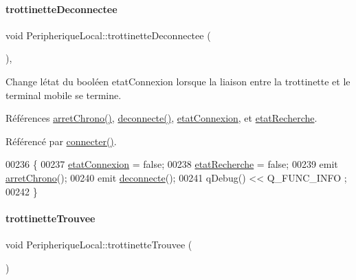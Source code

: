 \paragraph{\texorpdfstring{trottinette\+Deconnectee}{trottinetteDeconnectee}}
{\footnotesize\ttfamily void Peripherique\+Local\+::trottinette\+Deconnectee (\begin{DoxyParamCaption}{ }\end{DoxyParamCaption})\hspace{0.3cm}{\ttfamily [protected]}, {\ttfamily [slot]}}

Change l\textquotesingle{}état du booléen etat\+Connexion lorsque la liaison entre la trottinette et le terminal mobile se termine. 

Références \hyperlink{class_peripherique_local_a150599c1ded2462eb0e2d1d943459a34}{arret\+Chrono()}, \hyperlink{class_peripherique_local_a2a8f0b072821f6d76db20b6f73b6acd0}{deconnecte()}, \hyperlink{class_peripherique_local_a5359e5a94b32b8a90c06ec999de13d2c}{etat\+Connexion}, et \hyperlink{class_peripherique_local_a6638c29f6f75c3b4d329d93ae6ea4a48}{etat\+Recherche}.



Référencé par \hyperlink{class_peripherique_local_af2e7f023f8ed72ebc1d36e66c440ceca}{connecter()}.


\begin{DoxyCode}
00236 \{
00237     \hyperlink{class_peripherique_local_a5359e5a94b32b8a90c06ec999de13d2c}{etatConnexion} = \textcolor{keyword}{false};
00238     \hyperlink{class_peripherique_local_a6638c29f6f75c3b4d329d93ae6ea4a48}{etatRecherche} = \textcolor{keyword}{false};
00239     emit \hyperlink{class_peripherique_local_a150599c1ded2462eb0e2d1d943459a34}{arretChrono}();
00240     emit \hyperlink{class_peripherique_local_a2a8f0b072821f6d76db20b6f73b6acd0}{deconnecte}();
00241     qDebug() << Q\_FUNC\_INFO ;
00242 \}
\end{DoxyCode}
\mbox{\label{class_peripherique_local_ad388116a3ad558055dcf02fa854ab361}} 
\paragraph{\texorpdfstring{trottinette\+Trouvee}{trottinetteTrouvee}}
{\footnotesize\ttfamily void Peripherique\+Local\+::trottinette\+Trouvee (\begin{DoxyParamCaption}{ }\end{DoxyParamCaption})\hspace{0.3cm}{\ttfamily [signal]}}



